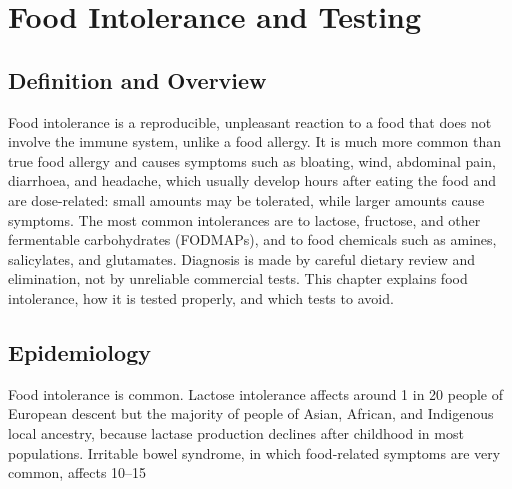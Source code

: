 \chapter{Food Intolerance and Testing}

\section*{Definition and Overview}
Food intolerance is a reproducible, unpleasant reaction to a food that does not involve the immune system, unlike a food allergy. It is much more common than true food allergy and causes symptoms such as bloating, wind, abdominal pain, diarrhoea, and headache, which usually develop hours after eating the food and are dose-related: small amounts may be tolerated, while larger amounts cause symptoms. The most common intolerances are to lactose, fructose, and other fermentable carbohydrates (FODMAPs), and to food chemicals such as amines, salicylates, and glutamates. Diagnosis is made by careful dietary review and elimination, not by unreliable commercial tests. This chapter explains food intolerance, how it is tested properly, and which tests to avoid.

\section*{Epidemiology}
Food intolerance is common. Lactose intolerance affects around 1 in 20 people of European descent but the majority of people of Asian, African, and Indigenous local ancestry, because lactase production declines after childhood in most populations. Irritable bowel syndrome, in which food-related symptoms are very common, affects 10--15%


